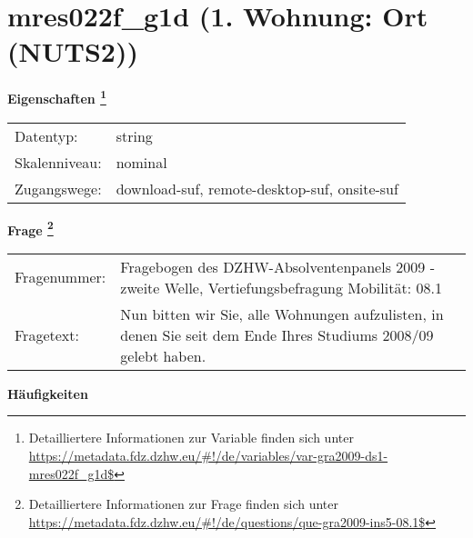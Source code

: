 
    \setcounter{footnote}{0}

    \vspace*{-1.8cm}
	\section{mres022f\_g1d (1. Wohnung: Ort (NUTS2))}
	\label{section:mres022f_g1d}



    \vspace*{0.5cm}
    \noindent\textbf{Eigenschaften
	\footnote{Detailliertere Informationen zur Variable finden sich unter
		\url{https://metadata.fdz.dzhw.eu/\#!/de/variables/var-gra2009-ds1-mres022f_g1d$}}}\\
	\begin{tabularx}{\hsize}{@{}lX}
	Datentyp: & string \\
	Skalenniveau: & nominal \\
	Zugangswege: &
	  download-suf, 
	  remote-desktop-suf, 
	  onsite-suf
 \\
    \end{tabularx}



				\vspace*{0.5cm}
                \noindent\textbf{Frage
	                \footnote{Detailliertere Informationen zur Frage finden sich unter
		              \url{https://metadata.fdz.dzhw.eu/\#!/de/questions/que-gra2009-ins5-08.1$}}}\\
				\begin{tabularx}{\hsize}{@{}lX}
					Fragenummer: &
					  Fragebogen des DZHW-Absolventenpanels 2009 - zweite Welle, Vertiefungsbefragung Mobilität:
					  08.1
 \\
					Fragetext: & Nun bitten wir Sie, alle Wohnungen aufzulisten, in denen Sie seit dem Ende Ihres Studiums 2008/09 gelebt haben. \\
				\end{tabularx}





        		\vspace*{0.5cm}
                \noindent\textbf{Häufigkeiten}

